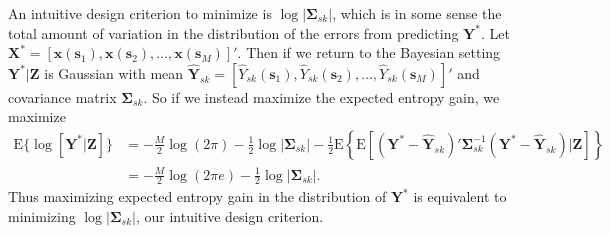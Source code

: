 \documentclass[12pt]{article}
\begin{document}
An intuitive design criterion to minimize is $\log|\bm{\Sigma}_{sk}|$, which is in some sense the total amount of variation in the distribution of the errors from predicting $\bm{Y}^*$. Let $\bm{X}^* = [\bm{x}(\bm{s}_1), \bm{x}(\bm{s}_2), \dots, \bm{x}(\bm{s}_M)]'$. Then if we return to the Bayesian setting $\bm{Y}^*|\bm{Z}$ is Gaussian with mean $\widehat{\bm{Y}}_{sk} = [\widehat{Y}_{sk}(\bm{s}_1), \widehat{Y}_{sk}(\bm{s}_2), \dots, \widehat{Y}_{sk}(\bm{s}_M)]'$ and covariance matrix $\bm{\Sigma}_{sk}$. So if we instead maximize the expected entropy gain, we maximize
\begin{align*}
\mathrm{E}\{\log[\bm{Y}^*|\bm{Z}]\} &= -\frac{M}{2}\log(2\pi) - \frac{1}{2}\log|\bm{\Sigma}_{sk}| - \frac{1}{2}\mathrm{E}\left\{\mathrm{E}[(\bm{Y}^* - \widehat{\bm{Y}}_{sk})'\bm{\Sigma}_{sk}^{-1}(\bm{Y}^* - \widehat{\bm{Y}}_{sk})|\bm{Z}]\right\}\\
&= -\frac{M}{2}\log(2\pi e) - \frac{1}{2}\log|\bm{\Sigma}_{sk}|.
\end{align*}
Thus maximizing expected entropy gain in the distribution of $\bm{Y}^*$ is equivalent to minimizing $\log|\bm{\Sigma}_{sk}|$, our intuitive design criterion.
\end{document}
